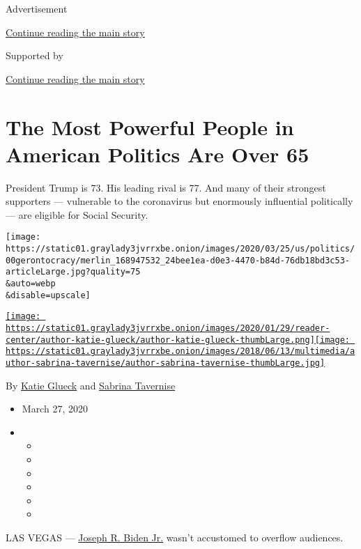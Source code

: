 Advertisement

\protect\hyperlink{after-top}{Continue reading the main story}

Supported by

\protect\hyperlink{after-sponsor}{Continue reading the main story}

\hypertarget{the-most-powerful-people-in-american-politics-are-over-65}{%
\section{The Most Powerful People in American Politics Are Over
65}\label{the-most-powerful-people-in-american-politics-are-over-65}}

President Trump is 73. His leading rival is 77. And many of their
strongest supporters --- vulnerable to the coronavirus but enormously
influential politically --- are eligible for Social Security.

\texttt{[image: https://static01.graylady3jvrrxbe.onion/images/2020/03/25/us/politics/00gerontocracy/merlin\_168947532\_24bee1ea-d0e3-4470-b84d-76db18bd3c53-articleLarge.jpg?quality=75\\\&auto=webp\\\&disable=upscale]}

\href{https://www.nytimes3xbfgragh.onion/by/katie-glueck}{\texttt{[image: https://static01.graylady3jvrrxbe.onion/images/2020/01/29/reader-center/author-katie-glueck/author-katie-glueck-thumbLarge.png]}}\href{https://www.nytimes3xbfgragh.onion/by/sabrina-tavernise}{\texttt{[image: https://static01.graylady3jvrrxbe.onion/images/2018/06/13/multimedia/author-sabrina-tavernise/author-sabrina-tavernise-thumbLarge.jpg]}}

By \href{https://www.nytimes3xbfgragh.onion/by/katie-glueck}{Katie
Glueck} and
\href{https://www.nytimes3xbfgragh.onion/by/sabrina-tavernise}{Sabrina
Tavernise}

\begin{itemize}
\item
  March 27, 2020
\item
  \begin{itemize}
  \item
  \item
  \item
  \item
  \item
  \item
  \end{itemize}
\end{itemize}

LAS VEGAS ---
\href{https://www.nytimes3xbfgragh.onion/interactive/2020/us/elections/joe-biden.html}{Joseph
R. Biden Jr.} wasn't accustomed to overflow audiences.

